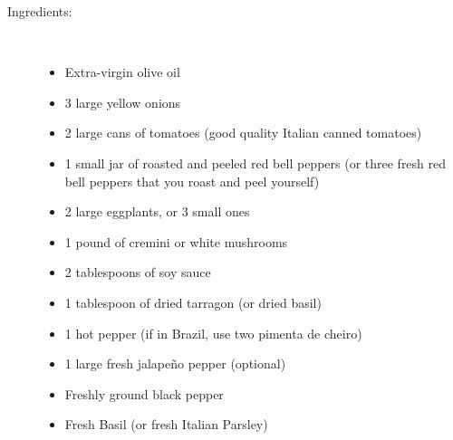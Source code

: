 \documentclass [11pt, letterpaper] {article}
\begin{document}
\begin{description}

\item[Ingredients:]\ \\
	\begin{itemize}
	\item Extra-virgin olive oil
	\item 3 large yellow onions 
	\item 2 large cans of tomatoes (good quality Italian canned tomatoes) 
	\item 1 small jar of roasted and peeled red bell peppers (or three fresh red bell peppers that you roast and peel yourself) 
	\item 2 large eggplants, or 3 small ones
	\item 1 pound of cremini or white mushrooms
	\item 2 tablespoons of soy sauce
	\item 1 tablespoon of dried tarragon (or dried basil)
	\item 1 hot pepper (if in Brazil, use two pimenta de cheiro)
	\item 1 large fresh jalape\~no pepper (optional)
	\item Freshly ground black pepper
	\item Fresh Basil (or fresh Italian Parsley)
	\end{itemize}


\end{description}
\end{document}
